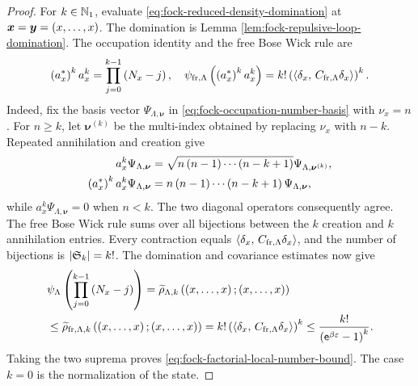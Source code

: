 \documentclass[11pt,a4paper]{article}
\theoremstyle{plain}
\theoremstyle{definition}
\theoremstyle{remark}
\begin{document}
\begin{proof}
For $k \in \mathbb{N}_1$, evaluate \eqref{eq:fock-reduced-density-domination} at
$\boldsymbol{x} = \boldsymbol{y} = \left( x,\ldots,x \right)$.
The domination is Lemma \ref{lem:fock-repulsive-loop-domination}.
The occupation identity and the free Bose Wick rule are
$$\begin{aligned}
\rbk{\faadj{a_x}}^{k}a_x^{k}
=
\prod_{j = 0}^{k - 1}\rbk{N_x - j},
\quad
\fun{\oastate[\psi_{\txtfr,\Lambda}]}{
\rbk{\faadj{a_x}}^{k}a_x^{k}}
=
k! \rbk{\bkt{\delta_x}{C_{\txtfr,\Lambda}\delta_x}}^{k}.
\end{aligned}$$
Indeed, fix the basis vector $\Psi_{\Lambda,\boldsymbol{\nu}}$ in
\eqref{eq:fock-occupation-number-basis} with $\nu_x=n$.
For $n\geq k$, let $\boldsymbol{\nu}^{(k)}$ be the multi-index obtained by replacing $\nu_x$ with $n-k$.
Repeated annihilation and creation give
$$\begin{aligned}
a_x^k\Psi_{\Lambda,\boldsymbol{\nu}}
& =
\sqrt{n\left( n-1 \right)\cdots\left( n-k+1 \right)}
\Psi_{\Lambda,\boldsymbol{\nu}^{(k)}},
\\
\left( a_x^{\ast} \right)^ka_x^k\Psi_{\Lambda,\boldsymbol{\nu}}
& =
n\left( n-1 \right)\cdots\left( n-k+1 \right)
\Psi_{\Lambda,\boldsymbol{\nu}},
\end{aligned}$$
while $a_x^k\Psi_{\Lambda,\boldsymbol{\nu}}=0$ when $n<k$.
The two diagonal operators consequently agree.
The free Bose Wick rule sums over all bijections between the $k$ creation and $k$ annihilation entries.
Every contraction equals $\left\langle \delta_x,\,C_{\mathrm{fr},\Lambda}\delta_x \right\rangle$, and the number of bijections is
$\abscard{\grsym{k}} = k!$.
The domination and covariance estimates now give
$$\begin{aligned}
&
\fun{\oastate[\psi_{\Lambda}]}{
\prod_{j=0}^{k-1}\rbk{N_x-j}}
=
\fun{\widetilde{\rho}_{\Lambda,k}}{
\rbk{x,\ldots,x};\rbk{x,\ldots,x}}
\\
& \leq
\fun{\widetilde{\rho}_{\txtfr,\Lambda,k}}{
\rbk{x,\ldots,x};\rbk{x,\ldots,x}}
=
k!\rbk{\bkt{\delta_x}{C_{\txtfr,\Lambda}\delta_x}}^k
\leq
\frac{k!}{\rbk{\napiernum^{\beta\varepsilon}-1}^k}.
\end{aligned}$$
Taking the two suprema proves \eqref{eq:fock-factorial-local-number-bound}.
The case $k = 0$ is the normalization of the state.


\end{proof}
\end{document}

